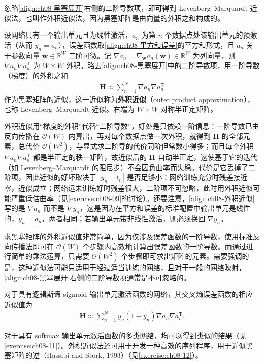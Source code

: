 \documentclass[../../main.tex]{subfiles}
\begin{document}
忽略\eqref{align:ch08-黑塞展开}右侧的二阶导数项，即可得到 Levenberg--Marquardt 近似法，也叫作外积近似法，因为黑塞矩阵是由向量的外积之和构成的。

\begin{definition}\label{definition:ch08-外积近似}
设网络只有一个输出单元且为线性激活，$a_n$ 为第 $n$ 个数据点处该输出单元的预激活（从而 $y_n=a_n$），误差函数取\eqref{align:ch08-平方和误差}的平方和形式，且 $a_n$ 关于参数向量 $\mathbf{w}\in\mathbb{R}^{W}$ 二阶可微。记 $\nabla a_n=\nabla_{\mathbf{w}}a_n(\mathbf{w})\in\mathbb{R}^{W}$ 为列向量，则 $\nabla a_n\nabla a_n^{\mathsf T}$ 为 $W\times W$ 外积。略去\eqref{align:ch08-黑塞展开}中的二阶导数项，用一阶导数（梯度）的外积之和
\begin{align}
\mathbf{H}\approx\sum_{n=1}^{N}\nabla a_n\nabla a_n^{\mathsf T}
\label{align:ch08-外积近似}
\end{align}
作为黑塞矩阵的近似，这一近似称为\textbf{外积近似}（outer product approximation），也称 Levenberg--Marquardt 近似。右端为 $W\times W$ 对称半正定矩阵。
\end{definition}

\begin{remark}
外积近似用“梯度的外积”代替“二阶导数”，好处是只依赖一阶信息：一阶导数已由反向传播在 $\mathcal{O}(W)$ 内算出，再对每个数据点做一次外积，就得到 $\mathbf{H}$ 的全部元素，总代价 $\mathcal{O}(W^{2})$，与显式求二阶导的代价同阶但常数小得多；而且每个外积 $\nabla a_n\nabla a_n^{\mathsf T}$ 都是半正定的秩一矩阵，故近似后的 $\mathbf{H}$ 自动半正定，这使基于它的迭代（如 Levenberg--Marquardt 的阻尼步）不会因负曲率而失稳。代价是它丢掉了二阶项，因此近似的好坏取决于 $|y_n-t_n|$ 是否足够小：网络训练充分时残差接近零，近似成立；网络远未训练好时残差很大，二阶项不可忽略，此时用外积近似可能严重低估曲率（见\cref{exercise:ch08-09}的讨论）。还要注意，\eqref{align:ch08-外积近似}写的是 $\nabla a_n$ 而不是 $\nabla y_n$，这是因为在平方和误差的标准配置中输出单元是线性的，$y_n=a_n$，两者相同；若输出单元带非线性激活，则必须换回 $\nabla y_n$。
\end{remark}

求黑塞矩阵的外积近似值非常简单，因为仅涉及误差函数的一阶导数，使用标准反向传播法即可在 $\mathcal{O}(W)$ 个步骤内高效地计算出误差函数的一阶导数。而通过进行简单的乘法运算，只需要 $\mathcal{O}(W^{2})$ 个步骤即可求出矩阵的元素。需要强调的是，这种近似法可能只适用于经过适当训练的网络，且对于一般的网络映射，\eqref{align:ch08-黑塞展开}右侧的二阶导数项通常是不可忽略的。

对于具有逻辑斯谛 sigmoid 输出单元激活函数的网络，其交叉熵误差函数的相应近似值为
\begin{align}
\mathbf{H}\approx\sum_{n=1}^{N}y_n\left(1-y_n\right)\nabla a_n\nabla a_n^{\mathsf T}.
\label{align:ch08-外积交叉熵}
\end{align}

对于具有 softmax 输出单元激活函数的多类网络，均可以得到类似的结果（见\cref{exercise:ch08-11}）。外积近似法还可用于开发一种高效的序列程序，用于近似黑塞矩阵的逆（Hassibi and Stork, 1993）（见\cref{exercise:ch08-12}）。
\end{document}
